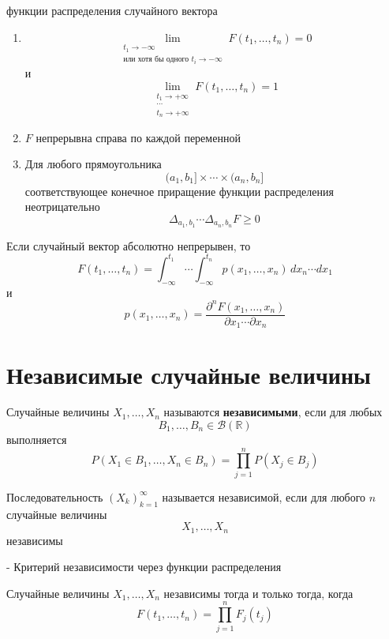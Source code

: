 \documentclass[12pt,a4paper]{article}
\begin{document}
\begin{props}{функции распределения случайного вектора}

\begin{enumerate}
    \item
    \[
    \lim_{\substack{t_1\to-\infty\\\text{или хотя бы одного }t_i\to-\infty}}
    F(t_1,\ldots,t_n)=0
    \]
    и
    \[
    \lim_{\substack{t_1\to+\infty\\\cdots\\t_n\to+\infty}}
    F(t_1,\ldots,t_n)=1
    \]

    \item $F$ непрерывна справа по каждой переменной

    \item Для любого прямоугольника
    \[
    (a_1,b_1]\times\cdots\times(a_n,b_n]
    \]
    соответствующее конечное приращение функции распределения неотрицательно
    \[
    \Delta_{a_1,b_1}\cdots\Delta_{a_n,b_n}F\geq0
    \]
\end{enumerate}

\end{props}

Если случайный вектор абсолютно непрерывен, то
\[
F(t_1,\ldots,t_n)
=
\int_{-\infty}^{t_1}\cdots
\int_{-\infty}^{t_n}
p(x_1,\ldots,x_n)\,dx_n\cdots dx_1
\]
и
\[
p(x_1,\ldots,x_n)
=
\frac{\partial^n F(x_1,\ldots,x_n)}
{\partial x_1\cdots\partial x_n}
\]

\newpage

\section{Независимые случайные величины}

\begin{definition}

Случайные величины $X_1,\ldots,X_n$ называются \textbf{независимыми}, если для любых
\[
B_1,\ldots,B_n\in\mathcal{B}(\mathbb{R})
\]
выполняется
\[
P(X_1\in B_1,\ldots,X_n\in B_n)
=
\prod_{j=1}^n P(X_j\in B_j)
\]

Последовательность $(X_k)_{k=1}^{\infty}$ называется независимой, если для любого $n$ случайные величины
\[
X_1,\ldots,X_n
\]
независимы

\end{definition}

\begin{theorem}{- Критерий независимости через функции распределения}

Случайные величины $X_1,\ldots,X_n$ независимы тогда и только тогда, когда
\[
F(t_1,\ldots,t_n)
=
\prod_{j=1}^n F_j(t_j)
\]

\end{theorem}
\end{document}
